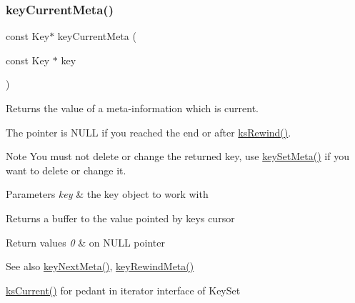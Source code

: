 \subsubsection{\texorpdfstring{key\+Current\+Meta()}{keyCurrentMeta()}}
{\footnotesize\ttfamily const Key$\ast$ key\+Current\+Meta (\begin{DoxyParamCaption}\item[{const Key $\ast$}]{key }\end{DoxyParamCaption})}



Returns the value of a meta-\/information which is current. 

The pointer is N\+U\+LL if you reached the end or after \hyperlink{group__keyset_gabe793ff51f1728e3429c84a8a9086b70}{ks\+Rewind()}.

\begin{DoxyNote}{Note}
You must not delete or change the returned key, use \hyperlink{group__keymeta_gae1f15546b234ffb6007d8a31178652b9}{key\+Set\+Meta()} if you want to delete or change it.
\end{DoxyNote}

\begin{DoxyParams}{Parameters}
{\em key} & the key object to work with \\
\hline
\end{DoxyParams}
\begin{DoxyReturn}{Returns}
a buffer to the value pointed by {\ttfamily key\textquotesingle{}s} cursor 
\end{DoxyReturn}

\begin{DoxyRetVals}{Return values}
{\em 0} & on N\+U\+LL pointer \\
\hline
\end{DoxyRetVals}
\begin{DoxySeeAlso}{See also}
\hyperlink{group__keymeta_ga4c88342f580a4291455a801af71ce048}{key\+Next\+Meta()}, \hyperlink{group__keymeta_ga5dbb669802eea27e106ee3a5e39717a9}{key\+Rewind\+Meta()}

\hyperlink{group__keyset_ga4287b9416912c5f2ab9c195cb74fb094}{ks\+Current()} for pedant in iterator interface of Key\+Set 
\end{DoxySeeAlso}
\mbox{\label{group__keymeta_ga9ed3875495ddb3d8a8d29158a60a147c}} 
